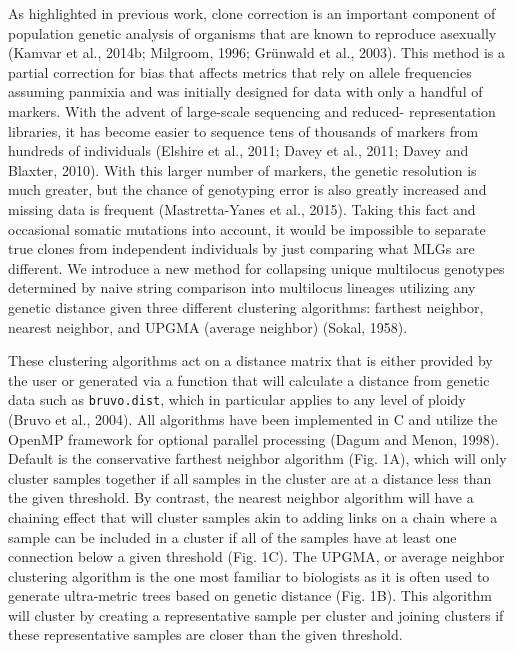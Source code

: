 \documentclass{frontiersSCNS} %
\begin{document}
As highlighted in previous work, clone correction is an important
component of population genetic analysis of organisms that are known to
reproduce asexually (Kamvar et al., 2014b; Milgroom, 1996; Grünwald et
al., 2003). This method is a partial correction for bias that affects
metrics that rely on allele frequencies assuming panmixia and was
initially designed for data with only a handful of markers. With the
advent of large-scale sequencing and reduced- representation libraries,
it has become easier to sequence tens of thousands of markers from
hundreds of individuals (Elshire et al., 2011; Davey et al., 2011; Davey
and Blaxter, 2010). With this larger number of markers, the genetic
resolution is much greater, but the chance of genotyping error is also
greatly increased and missing data is frequent (Mastretta-Yanes et al.,
2015). Taking this fact and occasional somatic mutations into account,
it would be impossible to separate true clones from independent
individuals by just comparing what MLGs are different. We introduce a
new method for collapsing unique multilocus genotypes determined by
naive string comparison into multilocus lineages utilizing any genetic
distance given three different clustering algorithms: farthest neighbor,
nearest neighbor, and UPGMA (average neighbor) (Sokal, 1958).

These clustering algorithms act on a distance matrix that is either
provided by the user or generated via a function that will calculate a
distance from genetic data such as \texttt{bruvo.dist}, which in
particular applies to any level of ploidy (Bruvo et al., 2004). All
algorithms have been implemented in C and utilize the OpenMP framework
for optional parallel processing (Dagum and Menon, 1998). Default is the
conservative farthest neighbor algorithm (Fig. 1A), which will only
cluster samples together if all samples in the cluster are at a distance
less than the given threshold. By contrast, the nearest neighbor
algorithm will have a chaining effect that will cluster samples akin to
adding links on a chain where a sample can be included in a cluster if
all of the samples have at least one connection below a given threshold
(Fig. 1C). The UPGMA, or average neighbor clustering algorithm is the
one most familiar to biologists as it is often used to generate
ultra-metric trees based on genetic distance (Fig. 1B). This algorithm
will cluster by creating a representative sample per cluster and joining
clusters if these representative samples are closer than the given
threshold.
\end{document}
